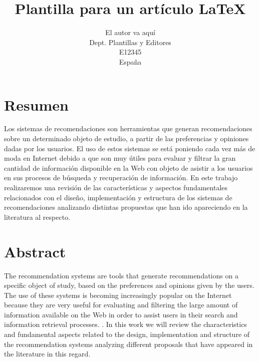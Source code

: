 %
%



\title{Plantilla para un artículo \LaTeX}
\author{El autor va aquí\\
  \small Dept. Plantillas y Editores\\
  \small E12345\\
  \small España
}


\section{Resumen}
Los sistemas de recomendaciones son herramientas que generan recomendaciones sobre un determinado objeto de estudio, a partir de las preferencias y opiniones dadas por los usuarios. El uso de estos sistemas se está poniendo cada vez más de moda en Internet debido a que son muy útiles para evaluar y filtrar la gran cantidad de información disponible en la Web con objeto de asistir a los usuarios en sus procesos de búsqueda y recuperación de información. En este trabajo realizaremos una revisión de las características y aspectos fundamentales relacionados con el diseño, implementación y estructura de los sistemas de recomendaciones analizando distintas propuestas que han ido apareciendo en la literatura al respecto.

\section{Abstract}
The recommendation systems are tools that generate recommendations on a specific object of study, based on the preferences and opinions given by the users. The use of these systems is becoming increasingly popular on the Internet because they are very useful for evaluating and filtering the large amount of information available on the Web in order to assist users in their search and information retrieval processes. . In this work we will review the characteristics and fundamental aspects related to the design, implementation and structure of the recommendation systems analyzing different proposals that have appeared in the literature in this regard.

\newpage

